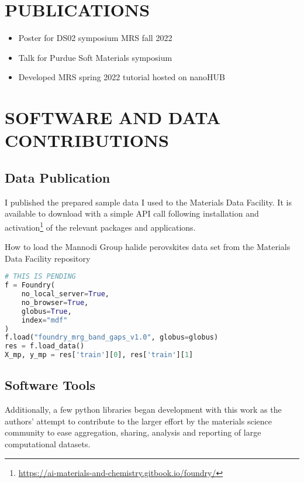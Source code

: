 \chapter{PUBLICATIONS}
\label{sec:org263c2e2}

\nocite{manganaris-2022-mrs-comput}
\nocite{yang-2023-high-throug}
\nocite{manganaris-2023-multi-fidel}
\nocite{gollapalli-2023-graph-neural}
\nocite{edlabadkar-2023-drivin-halid}
\nocite{yang-2023-discov-novel}

\printbibliography[heading=none,category=myarticles]

\begin{itemize}
\item Poster for DS02 symposium MRS fall 2022
\item Talk for Purdue Soft Materials symposium
\item Developed MRS spring 2022 tutorial hosted on nanoHUB\autocite{manganaris-2022-mrs-comput}
\end{itemize}

\chapter{SOFTWARE AND DATA CONTRIBUTIONS}
\label{sec:org02355b9}
\section{Data Publication}
\label{sec:orgcbe10d6}
I published the prepared sample data I used to the Materials Data Facility.
It is available to download with a simple API call following installation and activation\footnote{\url{https://ai-materials-and-chemistry.gitbook.io/foundry/}} of the relevant packages and applications.

\begin{ZZlisting}
  \caption{\label{lst:MDF} How to load the Mannodi Group halide perovskites data set from the Materials Data Facility repository}
  \begin{CenteredBox}
    \begin{lstlisting}[language=python]
# THIS IS PENDING
f = Foundry(
    no_local_server=True,
    no_browser=True,
    globus=True,
    index="mdf"
)
f.load("foundry_mrg_band_gaps_v1.0", globus=globus)
res = f.load_data()
X_mp, y_mp = res['train'][0], res['train'][1]
    \end{lstlisting}
  \end{CenteredBox}
\end{ZZlisting}

\section{Software Tools}
\label{sec:orgff0c4d9}
Additionally, a few python libraries began development with this work as the authors' attempt to contribute to the larger effort by the materials science community to ease aggregation, sharing, analysis and reporting of large computational datasets.

